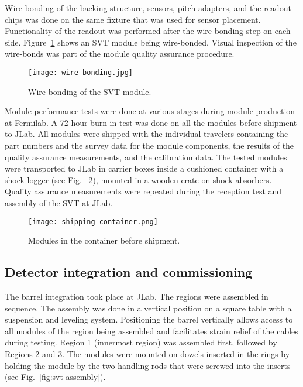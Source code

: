 Wire-bonding of the backing structure, sensors, pitch adapters, and the readout chips was done on the same fixture that was used for sensor placement. Functionality of the readout was performed after the wire-bonding step on each side. Figure~\ref{fig:wire-bonding} shows an SVT module being wire-bonded. Visual inspection of the wire-bonds was part of the module quality assurance procedure.

\begin{figure}[hbt] 
\centering 
\texttt{[image: wire-bonding.jpg]}
\caption{Wire-bonding of the SVT module.}
\label{fig:wire-bonding}
\end{figure}

Module performance tests were done at various stages during module production at Fermilab. A 72-hour burn-in test was done on all the modules before shipment to JLab. All modules were shipped with the individual travelers containing the part numbers and the survey data for the module components, the results of the quality assurance measurements, and the calibration data. The tested modules were transported to JLab in carrier boxes inside a cushioned container with a shock logger (see Fig. ~\ref{fig:shipping-container}), mounted in a wooden crate on shock absorbers. Quality assurance measurements were repeated during the reception test and assembly of the SVT at JLab. 

\begin{figure}[hbt] 
\centering 
\texttt{[image: shipping-container.png]}
\caption{Modules in the container before shipment.}
\label{fig:shipping-container}
\end{figure}

\subsection{Detector integration and commissioning}

The barrel integration took place at JLab. The regions were assembled in sequence. The assembly was done in a vertical position on a square table with a suspension and leveling system. Positioning the barrel vertically allows access to all modules of the region being assembled and facilitates strain relief of the cables during testing. Region 1 (innermost region) was assembled first, followed by Regions 2 and 3. The modules were mounted on dowels inserted in the rings by holding the module by the two handling rods that were screwed into the inserts (see Fig.~\ref{fig:svt-assembly}). 

